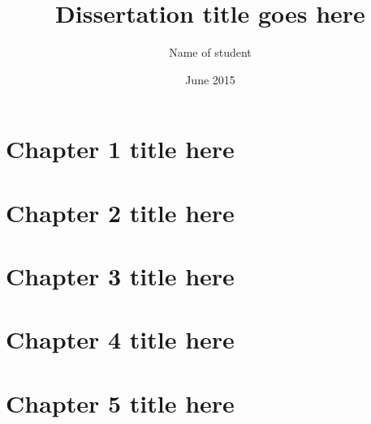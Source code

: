 \documentclass{BGSU}
\title{Dissertation title goes here}
\author{Name of student}
\date{June 2015}
\numberwithin{equation}{chapter}
\begin{document}
\frontmatter

\maketitle
%
\mbox{}\newpage

\begin{abstract}

\end{abstract}


\begin{acknowledgments}

\end{acknowledgments}

\mbox{}\newpage
\tableofcontents

\listoffigures

\mbox{}\newpage\mbox{}  %
\listoftables

\mainmatter %

\chapter{Chapter 1 title here}


\chapter{Chapter 2 title here}


\chapter{Chapter 3 title here}


\chapter{Chapter 4 title here}


\chapter{Chapter 5 title here}

\end{document}
